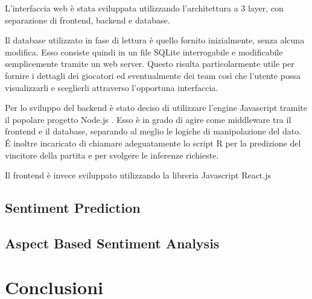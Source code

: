 \documentclass[hidelinks, 12pt]{article}
\begin{document}
L'interfaccia web è stata sviluppata utilizzando l'architettura a 3 layer, con separazione di frontend, backend e database.

Il database utilizzato in fase di lettura è quello fornito inizialmente, senza alcuna modifica. Esso consiste quindi in un file SQLite interrogabile e modificabile semplicemente tramite un web server. Questo risulta particolarmente utile per fornire i dettagli dei giocatori ed eventualmente dei team così che l'utente possa visualizzarli e sceglierli attraverso l'opportuna interfaccia.

Per lo sviluppo del backend è stato deciso di utilizzare l'engine Javascript tramite il popolare progetto Node.js \cite{site:nodejs}. Esso è in grado di agire come middleware tra il frontend e il database, separando al meglio le logiche di manipolazione del dato. \'E inoltre incaricato di chiamare adeguatamente lo script R per la predizione del vincitore della partita e per svolgere le inferenze richieste.

Il frontend è invece sviluppato utilizzando la libreria Javascript React.js \cite{site:react}



\subsection{Sentiment Prediction}

\subsection{Aspect Based Sentiment Analysis}



\clearpage



\section{Conclusioni}





\newpage


	
\end{document}

